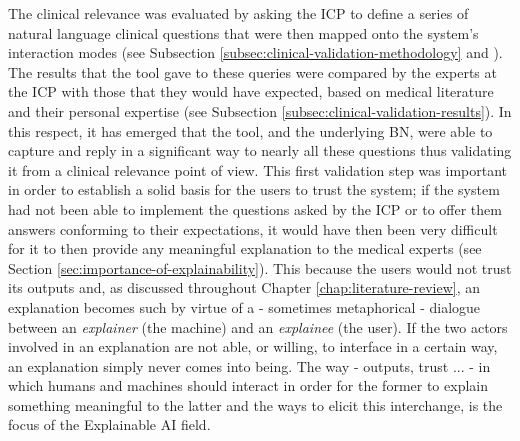 The clinical relevance was evaluated by asking the ICP to define a series of natural language clinical questions that were then mapped onto the system's interaction modes (see Subsection \ref{subsec:clinical-validation-methodology} and ).
The results that the tool gave to these queries were compared by the experts at the ICP with those that they would have expected, based on medical literature and their personal expertise (see Subsection \ref{subsec:clinical-validation-results}).
In this respect, it has emerged that the tool, and the underlying BN, were able to capture and reply in a significant way to nearly all these questions thus validating it from a clinical relevance point of view.
This first validation step was important in order to establish a solid basis for the users to trust the system; if the system had not been able to implement the questions asked by the ICP or to offer them answers conforming to their expectations, it would have then been very difficult for it to then provide any meaningful explanation to the medical experts (see Section \ref{sec:importance-of-explainability}).
This because the users would not trust its outputs and, as discussed throughout Chapter \ref{chap:literature-review}, an explanation becomes such by virtue of a - sometimes metaphorical - dialogue between an \textit{explainer} (the machine) and an \textit{explainee} (the user).
If the two actors involved in an explanation are not able, or willing, to interface in a certain way, an explanation simply never comes into being.
The way - outputs, trust ... - in which humans and machines should interact in order for the former to explain something meaningful to the latter and the ways to elicit this interchange, is the focus of the Explainable AI field.

